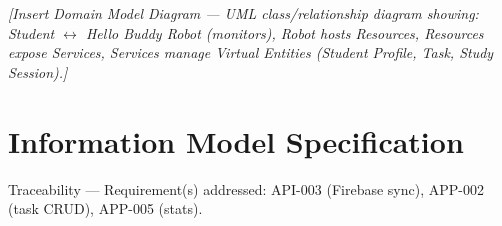 \documentclass[12pt,a4paper]{article}
\begin{document}
\vspace{0.3cm}
\begin{center}
\textit{[Insert Domain Model Diagram --- UML class/relationship diagram
showing: Student $\leftrightarrow$ Hello Buddy Robot (monitors),
Robot hosts Resources, Resources expose Services, Services manage
Virtual Entities (Student Profile, Task, Study Session).]}
\end{center}
\label{fig:domain}

\newpage
\section{Information Model Specification}

\begin{tracebox}
Traceability --- Requirement(s) addressed: API-003 (Firebase sync),
APP-002 (task CRUD), APP-005 (stats).
\end{tracebox}

\vspace{0.3cm}
\end{document}
